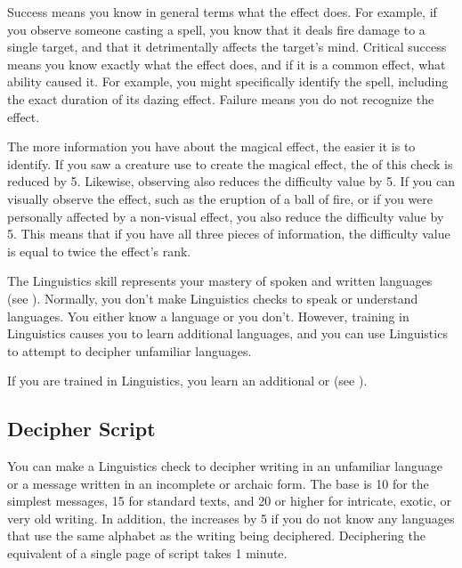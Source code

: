         Success means you know in general terms what the effect does.
        For example, if you observe someone casting a  spell, you know that it deals fire damage to a single target, and that it detrimentally affects the target's mind.
        Critical success means you know exactly what the effect does, and if it is a common effect, what ability caused it.
        For example, you might specifically identify the  spell, including the exact duration of its dazing effect.
        Failure means you do not recognize the effect.

        The more information you have about the magical effect, the easier it is to identify.
        If you saw a creature use  to create the magical effect, the  of this check is reduced by 5.
        Likewise, observing  also reduces the difficulty value by 5.
        If you can visually observe the effect, such as the eruption of a ball of fire, or if you were personally affected by a non-visual effect, you also reduce the difficulty value by 5.
        This means that if you have all three pieces of information, the difficulty value is equal to twice the effect's rank.

\newpage
{}
        The Linguistics skill represents your mastery of spoken and written languages (see ).
        Normally, you don't make Linguistics checks to speak or understand languages.
        You either know a language or you don't.
        However, training in Linguistics causes you to learn additional languages, and you can use Linguistics to attempt to decipher unfamiliar languages.

        If you are trained in Linguistics, you learn an additional  or  (see ).

    \subsection{Decipher Script}
        You can make a Linguistics check to decipher writing in an unfamiliar language or a message written in an incomplete or archaic form. The base  is 10 for the simplest messages, 15 for standard texts, and 20 or higher for intricate, exotic, or very old writing. In addition, the  increases by 5 if you do not know any languages that use the same alphabet as the writing being deciphered. Deciphering the equivalent of a single page of script takes 1 minute.

